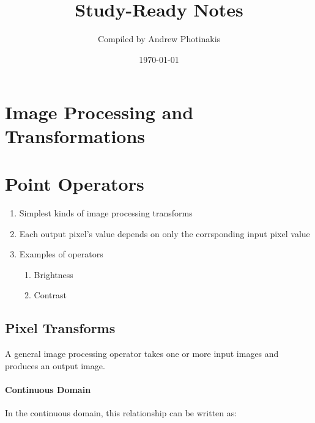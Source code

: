 \documentclass[12pt]{article}
\title{\TOPICTITLE\\\large Study-Ready Notes}
\author{Compiled by Andrew Photinakis}
\date{\today}
\begin{document}
\maketitle
\tableofcontents
\newpage

\section*{Image Processing and Transformations}

\section{Point Operators}

\begin{enumerate}
    \item Simplest kinds of image processing transforms
    \item Each output pixel's value depends on only the corrsponding input pixel value
    \item Examples of operators
          \begin{enumerate}
              \item Brightness
              \item Contrast
          \end{enumerate}
\end{enumerate}

\subsection{Pixel Transforms}

A general image processing operator takes one or more input images and produces an output image.

\paragraph{Continuous Domain}
In the continuous domain, this relationship can be written as:
\end{document}
